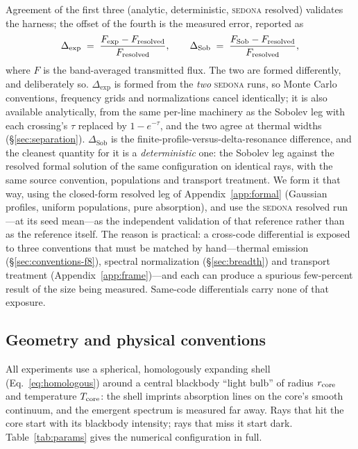 \documentclass[fleqn,usenatbib]{mnras}
\newcommand{\dexp}{\Delta_{\mathrm{exp}}}
\newcommand{\dsobp}{\Delta_{\mathrm{Sob}}}
\begin{document}
Agreement of the first three (analytic, deterministic, \textsc{sedona}
resolved) validates the harness; the offset of the fourth is the measured
error, reported as
\begin{equation}
  \dexp \;=\; \frac{F_{\rm exp} - F_{\rm resolved}}{F_{\rm resolved}},
  \qquad
  \dsobp \;=\; \frac{F_{\rm Sob} - F_{\rm resolved}}{F_{\rm resolved}},
\end{equation}
where $F$ is the band-averaged transmitted flux. The two are formed
differently, and deliberately so. $\dexp$ is formed from the \emph{two}
\textsc{sedona} runs, so Monte Carlo conventions, frequency grids and
normalizations cancel identically; it is also available analytically, from
the same per-line machinery as the Sobolev leg with each crossing's $\tau$
replaced by $1-e^{-\tau}$, and the two agree at thermal widths
(\S\ref{sec:separation}). $\dsobp$ is the finite-profile-versus-delta-resonance
difference, and the cleanest quantity for it is a \emph{deterministic} one:
the Sobolev leg against the resolved formal solution of the same
configuration on identical rays, with the same source convention, populations
and transport treatment. We form it that way, using the closed-form resolved
leg of Appendix~\ref{app:formal} (Gaussian profiles, uniform populations,
pure absorption), and use the \textsc{sedona} resolved run---at its seed
mean---as the independent validation of that reference rather than as the
reference itself. The reason is practical: a cross-code differential is
exposed to three conventions that must be matched by hand---thermal emission
(\S\ref{sec:conventions-f8}), spectral normalization (\S\ref{sec:breadth})
and transport treatment (Appendix~\ref{app:frame})---and each can produce a
spurious few-percent result of the size being measured. Same-code
differentials carry none of that exposure.

\subsection{Geometry and physical conventions}
\label{sec:conventions}

All experiments use a spherical, homologously expanding shell
(Eq.~\ref{eq:homologous}) around a central blackbody ``light bulb'' of
radius $r_{\rm core}$ and temperature $T_{\rm core}$: the shell imprints
absorption lines on the core's smooth continuum, and the emergent spectrum
is measured far away. Rays that hit the core start with its blackbody
intensity; rays that miss it start dark. Table~\ref{tab:params} gives the
numerical configuration in full.
\end{document}
